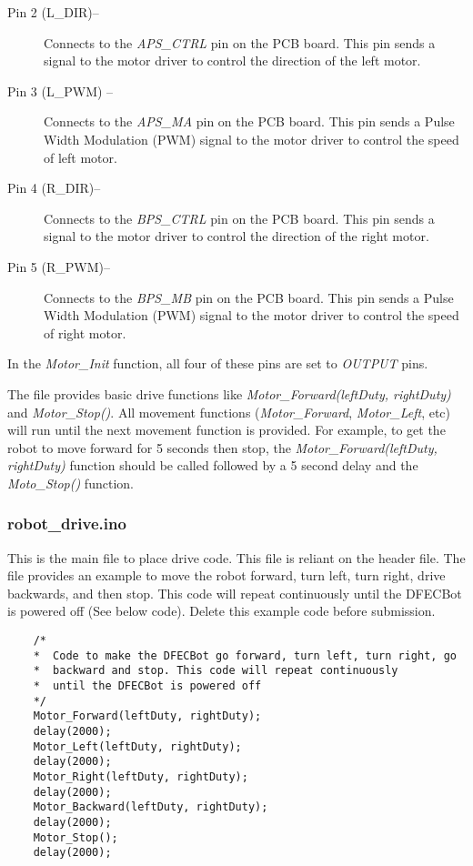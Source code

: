\documentclass{handout}
\begin{document}
	\begin{description}
		\item[Pin 2 (L\_DIR)--] Connects to the \textit{APS\_CTRL} pin on the PCB board. This pin sends a signal to the motor driver to control the direction of the left motor.
		
		\item[Pin 3 (L\_PWM) --] Connects to the \textit{APS\_MA} pin on the PCB board. This pin sends a Pulse Width Modulation (PWM) signal to the motor driver to control the speed of left motor.
		
		\item[Pin 4 (R\_DIR)--] Connects to the \textit{BPS\_CTRL} pin on the PCB board. This pin sends a signal to the motor driver to control the direction of the right motor.
		
		\item[Pin 5 (R\_PWM)--] Connects to the \textit{BPS\_MB} pin on the PCB board. This pin sends a Pulse Width Modulation (PWM) signal to the motor driver to control the speed of right motor.
		
	\end{description}
	
	In the \textit{Motor\_Init} function, all four of these pins are set to \textit{OUTPUT} pins. 
	
	The  file provides basic drive functions like \textit{Motor\_Forward(leftDuty, rightDuty)} and \textit{Motor\_Stop()}. All movement functions (\textit{Motor\_Forward}, \textit{Motor\_Left}, etc) will run until the next movement function is provided. For example, to get the robot to move forward for 5 seconds then stop, the \textit{Motor\_Forward(leftDuty, rightDuty)} function should be called followed by a 5 second delay and the \textit{Moto\_Stop()} function.
	
	\subsubsection{robot\_drive.ino}
	This is the main file to place drive code. This file is reliant on the  header file. The  file provides an example to move the robot forward, turn left, turn right, drive backwards, and then stop. This code will repeat continuously until the DFECBot is powered off (See below code). Delete this example code before submission.
	
	\newpage
	\clearpage
	\pagebreak
	\begin{lstlisting}
	/* 
	*  Code to make the DFECBot go forward, turn left, turn right, go 
	*  backward and stop. This code will repeat continuously 
	*  until the DFECBot is powered off
	*/
	Motor_Forward(leftDuty, rightDuty);
	delay(2000);
	Motor_Left(leftDuty, rightDuty);
	delay(2000);
	Motor_Right(leftDuty, rightDuty);
	delay(2000);
	Motor_Backward(leftDuty, rightDuty);
	delay(2000);
	Motor_Stop();
	delay(2000);
	\end{lstlisting}
\end{document}
